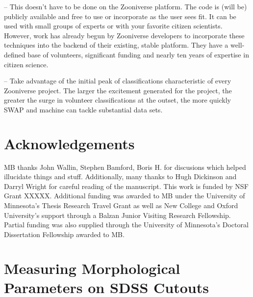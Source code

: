\documentclass[twocolumn]{aastex6}
\begin{document}
-- This doesn't have to be done on the Zooniverse platform. The code is (will be) 
publicly available and free to use or incorporate as the user sees fit. It can be used
with small groups of experts or with your favorite citizen scientists. However, 
work has already begun by Zooniverse developers to incorporate these techniques
into the backend of their existing, stable platform. They have a well-defined base 
of volunteers, significant funding and nearly ten years of expertise in citizen science. 


-- Take advantage of the initial peak of classifications characteristic of every
Zooniverse project. The larger the excitement generated for the project, the greater
the surge in volunteer classifications at the outset, the more quickly SWAP and
machine can tackle substantial data sets. 


\section{Acknowledgements}
MB thanks John Wallin, Stephen Bamford, Boris H. for discusions which helped illucidate things and stuff. 
Additionally, many thanks to Hugh Dickinson and Darryl Wright for careful reading of the manuscript. 
This work is funded by NSF Grant XXXXX. Additional funding was awarded to MB 
under the University of Minnesota's Thesis Research Travel Grant as well as
New College and Oxford University's support through a Balzan Junior Visiting 
Research Fellowship. Partial funding was also supplied through the University of
Minnesota's Doctoral Dissertation Fellowship awarded to MB. 





\appendix

\section{Measuring Morphological Parameters on SDSS Cutouts}
\label{sec:Appendix}
\end{document}

